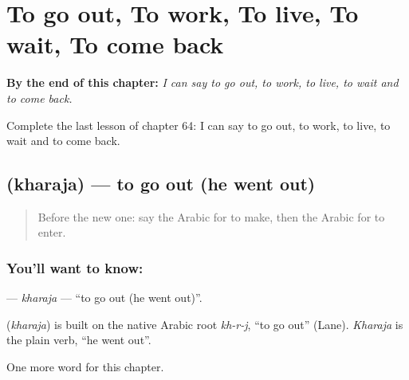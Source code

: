 
\chapter{To go out, To work, To live, To wait, To come back}
\label{ch:ar-to-go-out-to-work-to-live-to-wait-to-come-back}

\begin{chapteropening}
\textbf{By the end of this chapter:} \emph{I can say to go out, to work, to live, to wait and to come back.}

Complete the last lesson of chapter 64: I can say to go out, to work, to live, to wait and to come back.
\end{chapteropening}

\section[\texorpdfstring{\ar{خرج} (kharaja)}{خرج (kharaja)}]{ (kharaja) — to go out (he went out)}

\label{lesson:AR-C64-kharaja}



\begin{quote}
Before the new one: say the Arabic for to make, then the Arabic for to enter.
\end{quote}

\subsection*{You'll want to know: }
\textbf{} — \emph{kharaja} — \textquotedblleft{}to go out (he went out)\textquotedblright{}.

\begin{cousinweb}
\textbf{} (\emph{kharaja}) is built on the native Arabic root \emph{kh-r-j}, \textquotedblleft{}to go out\textquotedblright{} (Lane). \emph{Kharaja} is the plain verb, \textquotedblleft{}he went out\textquotedblright{}.
\end{cousinweb}

\begin{grammarlens}[title={What you've built}]
One more word for this chapter.
\end{grammarlens}

